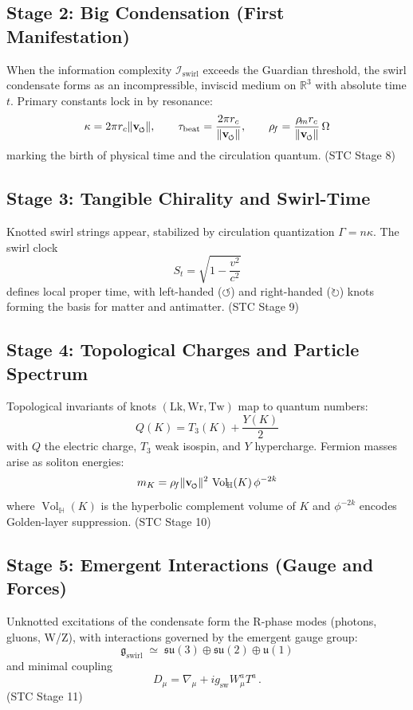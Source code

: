 \documentclass[10pt,reprint,aps,onecolumn,nofootinbib]{revtex4-2}
\newcommand{\vnorm}{\lVert \mathbf{v}_{\mkern-2mu\scriptscriptstyle\boldsymbol{\circlearrowleft}} \rVert}               %
\newcommand{\Vol}{\operatorname{Vol}}   %
\begin{document}
\subsection*{Stage 2: Big Condensation (First Manifestation)}
When the information complexity $\mathcal{I}_{\mathrm{swirl}}$ exceeds the Guardian threshold,
the swirl condensate forms as an incompressible, inviscid medium on $\mathbb{R}^3$ with absolute time $t$.
Primary constants lock in by resonance:
\[
\kappa = 2\pi r_c \vnorm,
\qquad
\tau_{\mathrm{beat}} = \frac{2\pi r_c}{\vnorm},
\qquad
\rho_{\!f} = \frac{\rho_{\!m} r_c}{\vnorm}\,\Omega
\]
marking the birth of physical time and the circulation quantum.
\hfill (STC Stage 8)

\subsection*{Stage 3: Tangible Chirality and Swirl-Time}
Knotted swirl strings appear, stabilized by circulation quantization $\Gamma = n\kappa$.
The swirl clock
\[
S_t = \sqrt{1 - \frac{v^{2}}{c^{2}}}
\]
defines local proper time, with left-handed ($\circlearrowleft$) and right-handed ($\circlearrowright$) knots forming the basis for matter and antimatter.
\hfill (STC Stage 9)

\subsection*{Stage 4: Topological Charges and Particle Spectrum}
Topological invariants of knots $(\mathrm{Lk}, \mathrm{Wr}, \mathrm{Tw})$ map to quantum numbers:
\[
Q(K) = T_3(K) + \frac{Y(K)}{2}
\]
with $Q$ the electric charge, $T_3$ weak isospin, and $Y$ hypercharge.
Fermion masses arise as soliton energies:
\[
m_{K} = \rho_{\!f} \vnorm^{2}\, \Vol_{\!\mathbb{H}}(K)\,\phi^{-2k}
\]
where $\Vol_{\!\mathbb{H}}(K)$ is the hyperbolic complement volume of $K$
and $\phi^{-2k}$ encodes Golden-layer suppression.
\hfill (STC Stage 10)

\subsection*{Stage 5: Emergent Interactions (Gauge and Forces)}
Unknotted excitations of the condensate form the R-phase modes (photons, gluons, W/Z),
with interactions governed by the emergent gauge group:
\[
\mathfrak{g}_{\mathrm{swirl}} \;\simeq\;
\mathfrak{su}(3) \oplus \mathfrak{su}(2) \oplus \mathfrak{u}(1)
\]
and minimal coupling
\[
D_\mu = \nabla_\mu + i g_{\mathrm{sw}} W_{\mu}^{a}T^{a}\,.
\]
\hfill (STC Stage 11)
\end{document}
